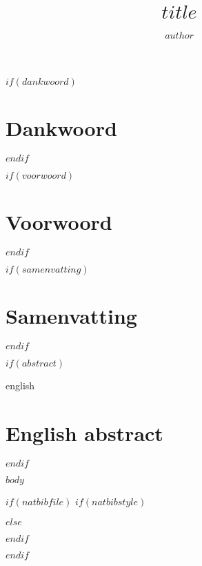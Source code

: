 \documentclass[9pt, twoside]{extreport}
\title{$title$}
\author{$author$}
\begin{document}
\maketitle
{}

$if(dankwoord)$
  \chapter*{Dankwoord}
  
$endif$

$if(voorwoord)$
  \chapter*{Voorwoord}
  
$endif$

$if(samenvatting)$
  \chapter*{Samenvatting}
  
$endif$

$if(abstract)$
  \begin{otherlanguage*}{english}
  \chapter*{English abstract}
  
  \end{otherlanguage*}
$endif$

\tableofcontents
{}

\newpage
{}

$body$

$if(natbibfile)$
$if(natbibstyle)$

$else$

$endif$
  
$endif$
\end{document}
